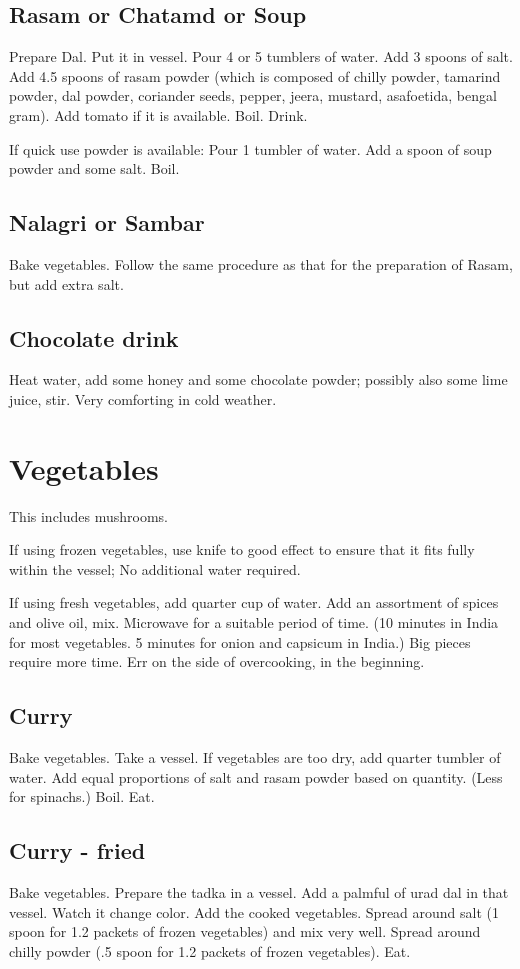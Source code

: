 \documentclass[oneside, article]{memoir}
\begin{document}
\subsection{Rasam or Chatamd or Soup}
Prepare Dal. Put it in vessel. Pour 4 or 5 tumblers of water. Add 3 spoons of salt. Add 4.5 spoons of rasam powder (which is composed of chilly powder, tamarind powder, dal powder, coriander seeds, pepper, jeera, mustard, asafoetida, bengal gram). Add tomato if it is available. Boil. Drink.

If quick use powder is available:  Pour 1 tumbler of water. Add a spoon of soup powder and some salt. Boil.

\subsection{Nalagri or Sambar}
Bake vegetables. Follow the same procedure as that for the preparation of Rasam, but add extra salt.

\subsection{Chocolate drink}
Heat water, add some honey and some chocolate powder; possibly also some lime juice, stir. Very comforting in cold weather.

\section{Vegetables}
This includes mushrooms.

If using frozen vegetables, use knife to good effect to ensure that it fits fully within the vessel; No additional water required.

If using fresh vegetables, add quarter cup of water. Add an assortment of spices and olive oil, mix. Microwave for a suitable period of time. (10 minutes in India for most vegetables. 5 minutes for onion and capsicum in India.) Big pieces require more time. Err on the side of overcooking, in the beginning.

\subsection{Curry}
Bake vegetables. Take a vessel. If vegetables are too dry, add quarter tumbler of water. Add equal proportions of salt and rasam powder based on quantity. (Less for spinachs.) Boil. Eat.

\subsection{Curry - fried}
Bake vegetables. Prepare the tadka in a vessel. Add a palmful of urad dal in that vessel. Watch it change color. Add the cooked vegetables. Spread around salt (1 spoon for 1.2 packets of frozen vegetables) and mix very well. Spread around chilly powder (.5 spoon for 1.2 packets of frozen vegetables). Eat.
\end{document}
